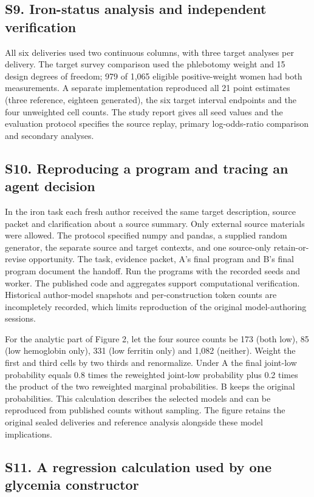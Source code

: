 \documentclass[sigconf,review]{acmart}
\begin{document}
\subsection*{S9. Iron-status analysis and independent verification}

All six deliveries used two continuous columns, with three target analyses per delivery. The target survey comparison used the phlebotomy weight and 15 design degrees of freedom; 979 of 1,065 eligible positive-weight women had both measurements. A separate implementation reproduced all 21 point estimates (three reference, eighteen generated), the six target interval endpoints and the four unweighted cell counts. The study report gives all seed values and the evaluation protocol specifies the source replay, primary log-odds-ratio comparison and secondary analyses.


\subsection*{S10. Reproducing a program and tracing an agent decision}

In the iron task each fresh author received the same target description, source packet and clarification about a source summary. Only external source materials were allowed. The protocol specified numpy and pandas, a supplied random generator, the separate source and target contexts, and one source-only retain-or-revise opportunity. The task, evidence packet, A's final program and B's final program document the handoff. Run the programs with the recorded seeds and worker. The published code and aggregates support computational verification. Historical author-model snapshots and per-construction token counts are incompletely recorded, which limits reproduction of the original model-authoring sessions.


For the analytic part of Figure 2, let the four source counts be 173 (both low), 85 (low hemoglobin only), 331 (low ferritin only) and 1,082 (neither). Weight the first and third cells by two thirds and renormalize. Under A the final joint-low probability equals 0.8 times the reweighted joint-low probability plus 0.2 times the product of the two reweighted marginal probabilities. B keeps the original probabilities. This calculation describes the selected models and can be reproduced from published counts without sampling. The figure retains the original sealed deliveries and reference analysis alongside these model implications.


\subsection*{S11. A regression calculation used by one glycemia constructor}
\end{document}
